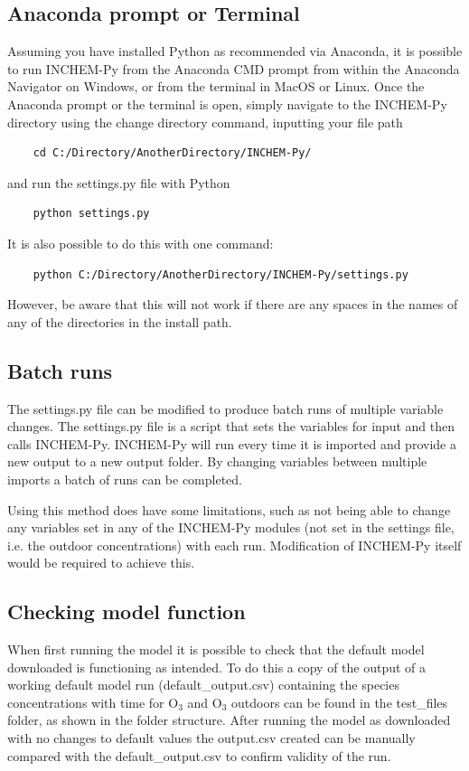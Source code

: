 \documentclass[a4paper]{refart}
\begin{document}
\subsection{Anaconda prompt or Terminal}
Assuming you have installed Python as recommended via Anaconda, it is possible to run INCHEM-Py from the Anaconda CMD prompt from within the Anaconda Navigator on Windows, or from the terminal in MacOS or Linux. Once the Anaconda prompt or the terminal is open, simply navigate to the INCHEM-Py directory using the change directory command, inputting your file path
\begin{verbatim}
    cd C:/Directory/AnotherDirectory/INCHEM-Py/
\end{verbatim}
and run the settings.py file with Python
\begin{verbatim}
    python settings.py
\end{verbatim}
It is also possible to do this with one command:
\begin{verbatim}
    python C:/Directory/AnotherDirectory/INCHEM-Py/settings.py
\end{verbatim}
However, be aware that this will not work if there are any spaces in the names of any of the directories in the install path.

\subsection{Batch runs}
The settings.py file can be modified to produce batch runs of multiple variable changes. The settings.py file is a script that sets the variables for input and then calls INCHEM-Py. INCHEM-Py will run every time it is imported and provide a new output to a new output folder. By changing variables between multiple imports a batch of runs can be completed.

Using this method does have some limitations, such as not being able to change any variables set in any of the INCHEM-Py modules (not set in the settings file, i.e. the outdoor concentrations) with each run. Modification of INCHEM-Py itself would be required to achieve this.

\subsection{Checking model function}
When first running the model it is possible to check that the default model downloaded is functioning as intended. To do this a copy of the output of a working default model run (default\_output.csv) containing the species concentrations with time for O$_3$ and O$_3$ outdoors can be found in the test\_files folder, as shown in the folder structure. After running the model as downloaded with no changes to default values the output.csv created can be manually compared with the default\_output.csv to confirm validity of the run.
\end{document}
